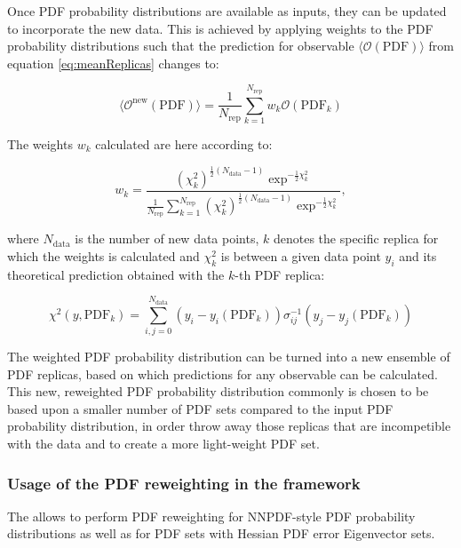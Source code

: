 Once PDF probability distributions are available as inputs, they can be updated to incorporate the new data. This is achieved by applying weights to the PDF probability distributions such that the prediction for observable $\langle\mathcal{O}(\mathrm{PDF})\rangle$ from equation \ref{eq:meanReplicas} changes to:

\begin{equation}
 \langle\mathcal{O}^{\mathrm{new}}(\mathrm{PDF})\rangle = \frac{1}{N_{\mathrm{rep}}} \sum_{k=1}^{N_{\mathrm{rep}}} w_k \mathcal{O}(\mathrm{PDF}_k)
\end{equation}

The weights $w_k$ calculated are here according to:

\begin{equation}
 w_k = \frac{(\chi^2_k)^{\frac{1}{2} (N_{\mathrm{data}}-1) } \exp^{-\frac{1}{2}\chi^2_k}}{ \frac{1}{N_{\mathrm{rep}}} \sum^{N_{\mathrm{rep}}}_{k=1}(\chi^2_k)^{\frac{1}{2}(N_{\mathrm{data}}-1)} \exp^{-\frac{1}{2}\chi^2_k}  },
\end{equation}

where $N_{\mathrm{data}}$ is the number of new data points, $k$ denotes the specific replica for which the weights is calculated and $\chi^2_k$ is between a given data point $y_i$ and its theoretical prediction obtained with the $k$-th PDF replica:

\begin{equation}
 \chi^2 (y,\mathrm{PDF}_k) = \sum_{i,j=0}^{N_{\mathrm{data}}} (y_i - y_i(\mathrm{PDF}_k)) \sigma^{-1}_{ij} (y_j-y_j(\mathrm{PDF}_k))  
\end{equation}

The weighted PDF probability distribution can be turned into a new ensemble of PDF replicas, based on which predictions for any observable can be calculated. This new, reweighted PDF probability distribution commonly is chosen to be based upon a smaller number of PDF sets compared to the input PDF probability distribution, in order throw away those replicas that are incompetible with the data and to create a more light-weight PDF set. 


\subsubsection{Usage of the PDF reweighting in the \fitter framework}
 
The \fitter allows to perform PDF reweighting for NNPDF-style PDF probability distributions as well as for PDF sets with Hessian PDF error Eigenvector sets. 


